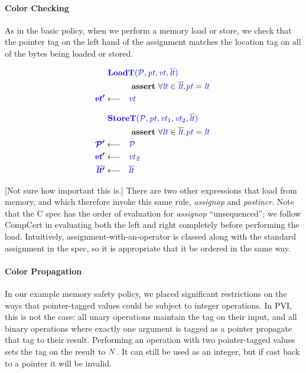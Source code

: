 \documentclass[acmsmall,review,anonymous]{acmart}\settopmatter{printfolios=true,printccs=false,printacmref=false}
\begin{document}
\paragraph*{Color Checking}

As in the basic policy, when we perform a memory load or store, we check that the pointer tag
on the left hand of the assignment matches the location tag on all of the bytes being loaded or stored.

\begin{minipage}{0.49\textwidth}
\[\begin{aligned}
\truledef{\loadt}
\assert{\forall \lt \in \overline{\lt} . \pt = \lt}
\settag{\vt'}{\vt}
\end{aligned}\]
\end{minipage}
\begin{minipage}{0.49\textwidth}
\[\begin{aligned}
\truledef{\storet}
\assert{\forall \lt \in \overline{\lt} . \pt = \lt}
\settag{\PCT'}{\PCT}
\settag{\vt'}{\vt_2}
\settag{\overline{\lt'}}{\overline{\lt}}
\end{aligned}\]
\end{minipage}

[Not sure how important this is.]
There are two other expressions that load from memory, and which therefore invoke
this same rule, {\it assignop} and {\it postincr}. Note that the C spec has the order
of evaluation for {\it assignop} ``unsequenced''; we follow CompCert \cite{Leroy09:CompCert}
in evaluating both the left
and right completely before performing the load. Intuitively, assignment-with-an-operator is
classed along with the standard assignment in the spec, so it is appropriate that it be ordered
in the same way.

\paragraph*{Color Propagation}

In our example memory safety policy, we placed significant restrictions on the
ways that pointer-tagged values could be subject to integer operations.
In PVI, this is not the case: all unary operations maintain the tag on their
input, and all binary operations where exactly one argument is tagged as a pointer
propagate that tag to their result. Performing an operation with two pointer-tagged values
sets the tag on the result to \({\color{blue} N}\). It can still
be used as an integer, but if cast back to a pointer it will be invalid.
            
\end{document}
